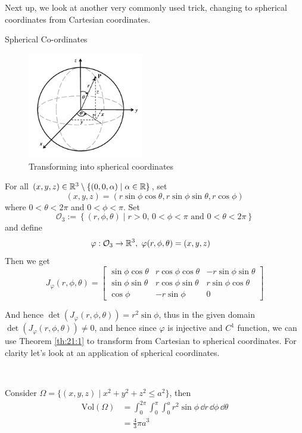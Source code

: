 \documentclass[../Analysis-3]{subfiles}
\begin{document}
Next up, we look at another very commonly used trick, changing to spherical coordinates from Cartesian coordinates.

\begin{Eg}{Spherical Co-ordinates}{}
    \begin{figure}
        \centering
        \includegraphics[width=0.45\textwidth]{../figures/lec21.2.png}
        \caption{Transforming into spherical coordinates}
        \label{fig2:21}
    \end{figure}
    For all $(x,y,z) \in \mathbb{R}^3 \setminus \{ (0,0,\alpha) \mid \alpha \in \mathbb{R} \}$, set
    \[
        (x,y,z) = (r\sin\phi\cos\theta, r\sin\phi\sin\theta, r \cos\phi)
    \]
    where $0 < \theta < 2\pi$ and $0 < \phi < \pi$. Set
    \[
        \mathcal{O}_3 := \left\{ (r,\phi,\theta) \mid r >0, \, 0 < \phi < \pi \mbox{ and } 0 < \theta < 2\pi \right\}
    \]
    and define
    \begin{align*}
        \varphi : \mathcal{O}_3 & \to \mathbb{R}^3, \ \varphi(r,\phi,\theta) = (x,y,z)
    \end{align*}
    Then we get
    \[
        J_{\varphi}(r,\phi,\theta) = \begin{bmatrix}
            \sin\phi\cos\theta & r\cos\phi\cos\theta & -r\sin\phi\sin\theta \\
            \sin\phi\sin\theta & r\cos\phi\sin\theta & r\sin\phi\cos\theta  \\
            \cos\phi           & -r\sin\phi          & 0
        \end{bmatrix}
    \]


    And hence $\det(J_{\varphi}(r,\phi,\theta)) = r^2 \sin \phi$, thus in the given domain $\det(J_{\varphi}(r,\phi,\theta)) \neq 0$, and hence since $\varphi$ is injective and $C^1$ function, we can use Theorem \ref{th:21:1} to transform from Cartesian to spherical coordinates. For clarity let's look at an application of spherical coordinates.

    \

    Consider $\Omega = \{ (x,y,z) \mid x^2 + y^2 + z^2 \leq a^2 \}$, then
    \begin{align*}
        \mathrm{Vol}(\Omega) & = \int_0^{2\pi}\int_0^{\pi} \int_0^a r^2 \sin \phi \, \dd r \, \dd \phi \, \dd \theta \\
                             & = \frac{4}{3}\pi a^3
    \end{align*}
\end{Eg}
\end{document}
